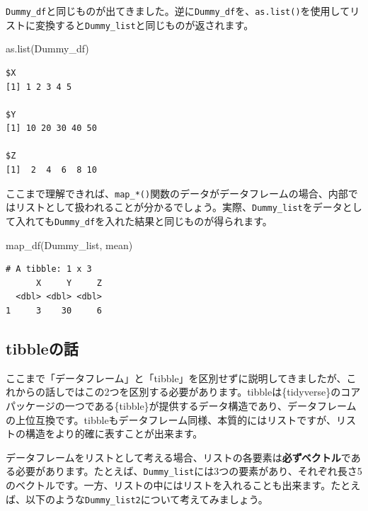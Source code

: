 \documentclass[
  a4paper,
  pandoc,
  ja=standard,
  jafont=haranoaji]{bxjsbook}
\newenvironment{Shaded}{\begin{snugshade}}{\end{snugshade}}
\newcommand{\FunctionTok}[1]{\textcolor[rgb]{0.28,0.35,0.67}{#1}}
\newcommand{\NormalTok}[1]{\textcolor[rgb]{0.00,0.48,0.65}{#1}}
\begin{document}
\texttt{Dummy\_df}と同じものが出てきました。逆に\texttt{Dummy\_df}を、\texttt{as.list()}を使用してリストに変換すると\texttt{Dummy\_list}と同じものが返されます。

\begin{Shaded}
\begin{Highlighting}[numbers=left,,]
\FunctionTok{as.list}\NormalTok{(Dummy\_df)}
\end{Highlighting}
\end{Shaded}

\begin{verbatim}
$X
[1] 1 2 3 4 5

$Y
[1] 10 20 30 40 50

$Z
[1]  2  4  6  8 10
\end{verbatim}

ここまで理解できれば、\texttt{map\_*()}関数のデータがデータフレームの場合、内部ではリストとして扱われることが分かるでしょう。実際、\texttt{Dummy\_list}をデータとして入れても\texttt{Dummy\_df}を入れた結果と同じものが得られます。

\begin{Shaded}
\begin{Highlighting}[numbers=left,,]
\FunctionTok{map\_df}\NormalTok{(Dummy\_list, mean)}
\end{Highlighting}
\end{Shaded}

\begin{verbatim}
# A tibble: 1 x 3
      X     Y     Z
  <dbl> <dbl> <dbl>
1     3    30     6
\end{verbatim}

\hypertarget{sec-iteration_tibble}{%
\subsection{tibbleの話}\label{sec-iteration_tibble}}

ここまで「データフレーム」と「tibble」を区別せずに説明してきましたが、これからの話しではこの2つを区別する必要があります。tibbleは\{tidyverse\}のコアパッケージの一つである\{tibble\}が提供するデータ構造であり、データフレームの上位互換です。tibbleもデータフレーム同様、本質的にはリストですが、リストの構造をより的確に表すことが出来ます。

データフレームをリストとして考える場合、リストの各要素は\textbf{必ずベクトル}である必要があります。たとえば、\texttt{Dummy\_list}には3つの要素があり、それぞれ長さ5のベクトルです。一方、リストの中にはリストを入れることも出来ます。たとえば、以下のような\texttt{Dummy\_list2}について考えてみましょう。
\end{document}
